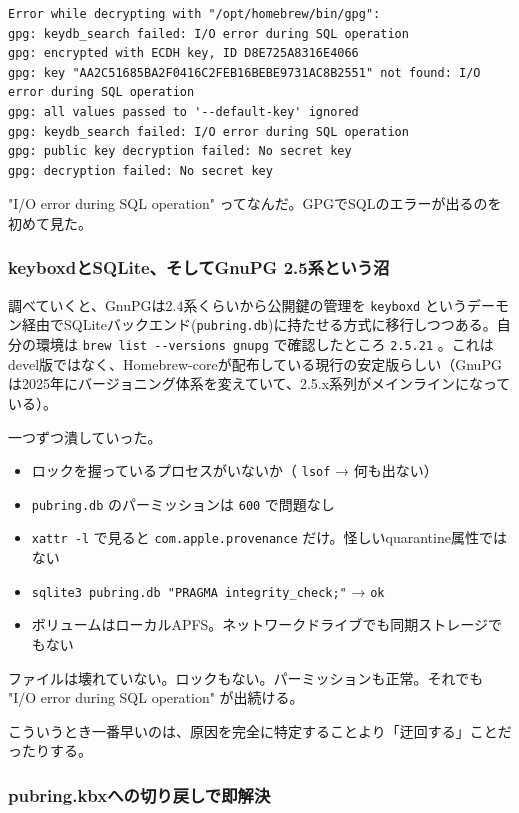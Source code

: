 \documentclass[11pt]{article}
\begin{document}
\begin{verbatim}
Error while decrypting with "/opt/homebrew/bin/gpg":
gpg: keydb_search failed: I/O error during SQL operation
gpg: encrypted with ECDH key, ID D8E725A8316E4066
gpg: key "AA2C51685BA2F0416C2FEB16BEBE9731AC8B2551" not found: I/O error during SQL operation
gpg: all values passed to '--default-key' ignored
gpg: keydb_search failed: I/O error during SQL operation
gpg: public key decryption failed: No secret key
gpg: decryption failed: No secret key
\end{verbatim}

"I/O error during SQL operation" ってなんだ。GPGでSQLのエラーが出るのを初めて見た。
\subsubsection{keyboxdとSQLite、そしてGnuPG 2.5系という沼}
\label{sec:org2ee394e}

調べていくと、GnuPGは2.4系くらいから公開鍵の管理を \texttt{keyboxd} というデーモン経由でSQLiteバックエンド(\texttt{pubring.db})に持たせる方式に移行しつつある。自分の環境は \texttt{brew list -{}-{}versions gnupg} で確認したところ \texttt{2.5.21} 。これはdevel版ではなく、Homebrew-coreが配布している現行の安定版らしい（GnuPGは2025年にバージョニング体系を変えていて、2.5.x系列がメインラインになっている）。

一つずつ潰していった。

\begin{itemize}
\item ロックを握っているプロセスがいないか（ \texttt{lsof} → 何も出ない）
\item \texttt{pubring.db} のパーミッションは \texttt{600} で問題なし
\item \texttt{xattr -l} で見ると \texttt{com.apple.provenance} だけ。怪しいquarantine属性ではない
\item \texttt{sqlite3 pubring.db "PRAGMA integrity\_check;"} → \texttt{ok}
\item ボリュームはローカルAPFS。ネットワークドライブでも同期ストレージでもない
\end{itemize}

ファイルは壊れていない。ロックもない。パーミッションも正常。それでも "I/O error during SQL operation" が出続ける。

こういうとき一番早いのは、原因を完全に特定することより「迂回する」ことだったりする。
\subsubsection{pubring.kbxへの切り戻しで即解決}
\label{sec:orga03ff06}
\end{document}
